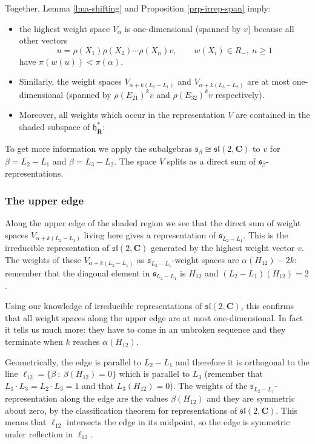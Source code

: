 \documentclass[12pt]{article}
\newcommand{\CC}{\mathbf{C}}
\newcommand{\RR}{\mathbf{R}}
\theoremstyle{definition}
\theoremstyle{check}
\theoremstyle{remark}
\theoremstyle{TheoremNum}
\begin{document}
Together, Lemma \ref{lma-shifting} and Proposition \ref{prp-irrep-span} imply:
\begin{itemize}
\item the highest weight space $V_{\alpha}$ is one-dimensional (spanned by $v$) because all other vectors
\[u=\rho(X_1)\rho(X_2)\cdots\rho(X_n)v,\qquad w(X_i)\in R_-,\ n\geq 1\]
have $\pi(w(u))<\pi(\alpha)$.
\item Similarly, the weight spaces $V_{\alpha+k(L_2-L_1)}$ and $V_{\alpha+k(L_3-L_2)}$ are at most one-dimensional (spanned by $\rho(E_{21})^kv$ and $\rho(E_{32})^kv$ respectively).
\item Moreover, all weights which occur in the representation $V$ are contained in the shaded subspace of $\mathfrak{h}_{\RR}^*$:
\end{itemize}
\sltritant
To get more information we apply the subalgebras $\mathfrak{s}_{\beta}\cong\mathfrak{sl}(2,\CC)$ to $v$ for $\beta=L_2-L_1$ and $\beta=L_3-L_2$. The space $V$ splits as a direct sum of $\mathfrak{s}_{\beta}$-representations.

\subsubsection{The upper edge}

Along the upper edge of the shaded region we see that the direct sum of weight spaces $V_{\alpha+k(L_2-L_1)}$ living here gives a representation of $\mathfrak{s}_{L_2-L_1}$. This is the irreducible representation of $\mathfrak{sl}(2,\CC)$ generated by the highest weight vector $v$. The weights of these $V_{\alpha+k(L_2-L_1)}$ as $\mathfrak{s}_{L_2-L_1}$-weight spaces are $\alpha(H_{12})-2k$: remember that the diagonal element in $\mathfrak{s}_{L_2-L_1}$ is $H_{12}$ and $(L_2-L_1)(H_{12})=2$.

Using our knowledge of irreducible representations of $\mathfrak{sl}(2,\CC)$, this confirms that all weight spaces along the upper edge are at most one-dimensional. In fact it tells us much more: they have to come in an unbroken sequence and they terminate when $k$ reaches $\alpha(H_{12})$.

Geometrically, the edge is parallel to $L_2-L_1$ and therefore it is orthogonal to the line $\ell_{12}=\{\beta\ :\ \beta(H_{12})=0\}$ which is parallel to $L_3$ (remember that $L_1\cdot L_3=L_2\cdot L_3=1$ and that $L_3(H_{12})=0$). The weights of the $\mathfrak{s}_{L_2-L_1}$-representation along the edge are the values $\beta(H_{12})$ and they are symmetric about zero, by the classification theorem for representations of $\mathfrak{sl}(2,\CC)$. This means that $\ell_{12}$ intersects the edge in its midpoint, so the edge is symmetric under reflection in $\ell_{12}$.
\end{document}
